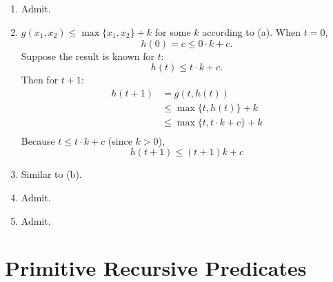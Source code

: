 \subsection{}
\begin{enumerate}
  \item Admit.
  
  \item 
  $ g(x_{1}, x_{2}) \le \max\{x_{1}, x_{2}\} + k $ for some $k$ according to (a).
  When $ t = 0 $, 
  \[ h(0) = c \le 0 \cdot k + c .\]
  Suppose the result is known for $ t $:
  \[ h(t) \le t \cdot k + c .\]
  Then for $ t+1 $:
  \begin{align*}
    h(t+1) & = g(t, h(t)) \\
           & \le \max\{t, h(t)\} + k \\
           & \le \max\{t, t \cdot k + c\} + k \\
  \end{align*}
  Because $ t \le t \cdot k + c $ (since $k>0$), 
  \[ h(t+1) \le (t+1)k+c \]

  \item Similar to (b).
  \item Admit.
  \item Admit.
\end{enumerate}



\section{Primitive Recursive Predicates}


